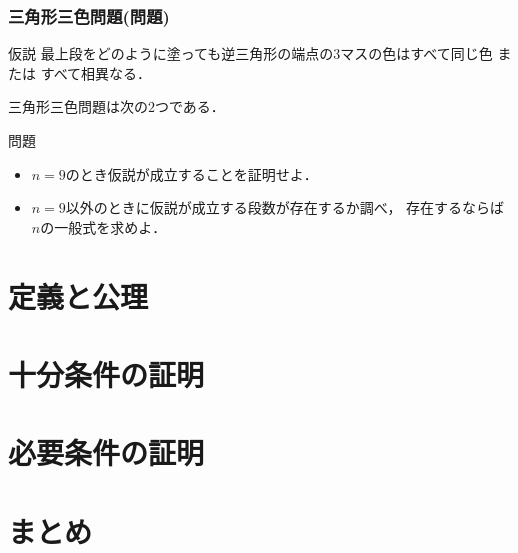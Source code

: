 \documentclass[dvipdfmx,cjk]{beamer}
\begin{document}
\begin{frame}
  \frametitle{三角形三色問題(問題)}
  \begin{block}{仮説}
    最上段をどのように塗っても逆三角形の端点の$3$マスの色はすべて同じ色 または すべて相異なる．
  \end{block}

  \vspace{10pt}
  三角形三色問題は次の$2$つである．
  \begin{block}{問題}
    \begin{itemize}
    \item
      $n=9$のとき仮説が成立することを証明せよ．
    \item
      $n=9$以外のときに仮説が成立する段数が存在するか調べ，
      存在するならば$n$の一般式を求めよ．
    \end{itemize}
  \end{block}
\end{frame}

\section{定義と公理}
\begin{frame}
  
\end{frame}
\section{十分条件の証明}
\begin{frame}
  
\end{frame}
\section{必要条件の証明}
\begin{frame}
  
\end{frame}
\section{まとめ}
\begin{frame}
  
\end{frame}
\end{document}
